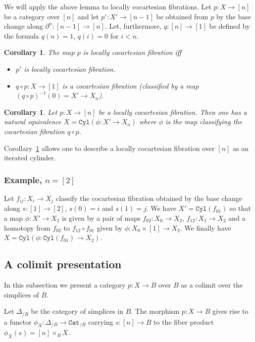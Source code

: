 \documentclass[12pt]{amsart}%
\newtheorem{crl}[subsubsection]{Corollary}
\newcommand{\Cat}{\mathtt{Cat}}
\newcommand{\Cyl}{\mathtt{Cyl}}
\begin{document}
We will apply the above lemma to locally cocartesian fibrations.
Let $p:X\to[n]$ be a category over $[n]$ and let $p':X'\to[n-1]$
be obtained from $p$ by the base change along $\partial^n:[n-1]\to[n]$.
Let, furthermore, $q:[n]\to[1]$ be defined by the formula
$q(n)=1$, $q(i)=0$ for $i<n$. 

\begin{crl}The map $p$ is locally cocartesian fibration iff
\begin{itemize}
\item[1.] $p'$ is locally cocartesian fibration.
\item[2.] $q\circ p:X\to[1]$ is a cocartesian fibration
(classified by a map $(q\circ p)^{-1}(0)=X'\to X_n$).
\end{itemize}
\end{crl}
\begin{crl}
\label{crl:cyl-expression}
Let $p:X\to[n]$ be a locally cocartesian fibration. Then
one has a natural equivalence $X=\Cyl(\phi:X'\to X_n)$ where $\phi$
is the map classifying the cocartesian fibration $q\circ p$.
\end{crl}

Corollary~\ref{crl:cyl-expression} allows one to describe a locally cocartesian fibration over $[n]$ as an iterated cylinder. 



\subsubsection{Example, $n=[2]$}
Let $f_{ij}:X_i\to X_j$ classify the cocartesian fibration obtained by
the base change along $s:[1]\to[2]$, $s(0)=i$ and $s(1)=j$.
We have $X'=\Cyl(f_{01})$ so that a map $\phi:X'\to X_2$ is given by
a pair of maps $f_{02}:X_0\to X_2$, $f_{12}:X_1\to X_2$ and a homotopy
from $f_{02}$ to $f_{12}\circ f_{01}$ given by $\phi:X_0\times[1]\to X_2$.
We finally have $X=\Cyl(\phi:\Cyl(f_{01})\to X_2)$.

\subsection{A colimit presentation}
 
 In this subsection we  present a category $p:X\to B$ over $B$ as a 
colimit over the simplices of $B$.

Let $\Delta_{/B}$ be the category of simplices in $B$. The morphism
$p:X\to B$ gives rise to a functor $\phi_X:\Delta_{/B}\to\Cat_{/B}$
carrying $s:[n]\to B$ to the fiber product $\phi_X(s)=[n]\times_BX$.
\end{document}
